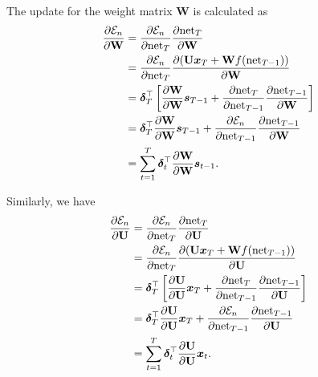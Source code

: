 \documentclass[a4paper, 12pt]{report}
\begin{document}
The update for the weight matrix $\textbf{W}$ is calculated as
\begin{align}
\frac{\partial {\mathcal{E}_n}}{\partial {\textbf{W}}} &=  \frac{\partial {\mathcal{E}_n}}{\partial {\mathrm{net}_{T}}} \frac{\partial {\mathrm{net}_T}}{\partial {\textbf{W}}} \notag \\
&=  \frac{\partial {\mathcal{E}_n}}{\partial {\mathrm{net}_{T}}} \frac{\partial {(\textbf{U} \bm{x}_T + \textbf{W} f(\mathrm{net}_{T-1})})}{\partial {\textbf{W}}} \notag \\
&= \bm{\delta}^{\top}_T \left[ \frac{\partial {\textbf{W}}}{ \partial {\textbf{W}}} \bm{s}_{T-1} + \frac{\partial {\mathrm{net}_T}}{\partial {\mathrm{net}_{T-1}}} \frac {\partial {\mathrm{net}_{T-1}}}{\partial{\textbf{W}}}\right] \notag \\
&=  \bm{\delta}^{\top}_T  \frac{\partial {\textbf{W}}}{ \partial {\textbf{W}}} \bm{s}_{T-1} +  \frac{\partial {\mathcal{E}_n}}{\partial {\mathrm{net}_{T-1}}} \frac {\partial {\mathrm{net}_{T-1}}}{\partial{\textbf{W}}} \notag  \\
&=  \sum_{t=1}^{T} \bm{\delta}^{\top}_t  \frac{\partial {\textbf{W}}}{ \partial {\textbf{W}}} \bm{s}_{t-1}.
\end{align}

Similarly, we have
\begin{align}
\frac{\partial {\mathcal{E}_n}}{\partial {\textbf{U}}} &=  \frac{\partial {\mathcal{E}_n}}{\partial {\mathrm{net}_{T}}} \frac{\partial {\mathrm{net}_T}}{\partial {\textbf{U}}} \notag \\
&=  \frac{\partial {\mathcal{E}_n}}{\partial {\mathrm{net}_{T}}} \frac{\partial {(\textbf{U} \bm{x}_T + \textbf{W} f(\mathrm{net}_{T-1})})}{\partial {\textbf{U}}} \notag \\
&= \bm{\delta}^{\top}_T \left[ \frac{\partial {\textbf{U}}}{ \partial {\textbf{U}}} \bm{x}_{T} + \frac{\partial {\mathrm{net}_T}}{\partial {\mathrm{net}_{T-1}}} \frac {\partial {\mathrm{net}_{T-1}}}{\partial{\textbf{U}}}\right] \notag \\
&=  \bm{\delta}^{\top}_T  \frac{\partial {\textbf{U}}}{ \partial {\textbf{U}}} \bm{x}_{T} +  \frac{\partial {\mathcal{E}_n}}{\partial {\mathrm{net}_{T-1}}} \frac {\partial {\mathrm{net}_{T-1}}}{\partial{\textbf{U}}} \notag  \\
&=  \sum_{t=1}^{T} \bm{\delta}^{\top}_t  \frac{\partial {\textbf{U}}}{ \partial {\textbf{U}}} \bm{x}_{t}.
\end{align}
\end{document}
